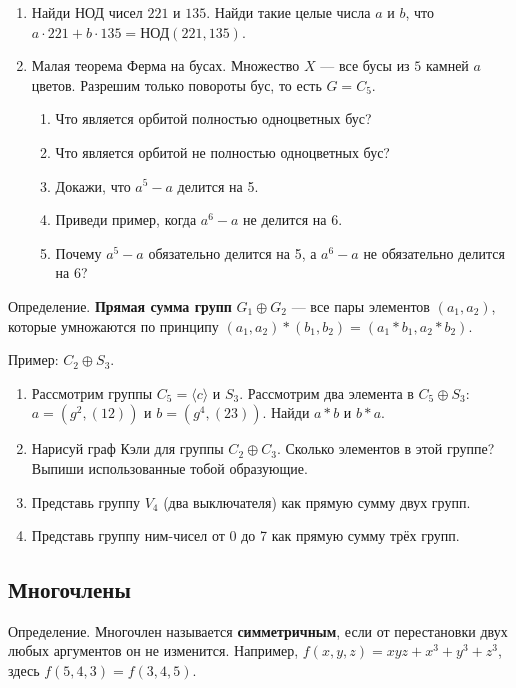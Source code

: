 \documentclass[12pt]{article} %
\begin{document}
\begin{enumerate}
\item Найди НОД чисел $221$ и $135$. Найди такие целые числа $a$ и $b$, что $a\cdot 221 + b\cdot 135 = \text{НОД}(221, 135)$.

\item Малая теорема Ферма на бусах. Множество $X$ — все бусы из $5$ камней $a$ цветов. Разрешим только повороты бус, то есть $G = C_5$.
\begin{enumerate}
\item Что является орбитой полностью одноцветных бус?
\item Что является орбитой не полностью одноцветных бус?
\item Докажи, что $a^5 - a$ делится на 5.
\item Приведи пример, когда $a^6 - a$ не делится на 6.
\item Почему $a^5 - a$ обязательно делится на 5, а $a^6 - a$ не обязательно делится на 6?
\end{enumerate}

\end{enumerate}


\newpage
Определение. \textbf{Прямая сумма групп} $G_1 \oplus G_2$ — все пары элементов $(a_1, a_2)$, которые умножаются по принципу $(a_1, a_2) * (b_1, b_2) = (a_1 * b_1, a_2 * b_2)$.

Пример: $C_2 \oplus S_3$.

\begin{enumerate}[resume]
\item Рассмотрим группы $C_5 = \langle c \rangle$ и $S_3$. Рассмотрим два элемента в $C_5 \oplus S_3$: $a = (g^2, (12))$ и $b = (g^4, (23))$. Найди $a*b$ и $b*a$.
\item Нарисуй граф Кэли для группы $C_2 \oplus C_3$. Сколько элементов в этой группе? Выпиши использованные тобой образующие.
\item Представь группу $V_4$ (два выключателя) как прямую сумму двух групп.
\item Представь группу ним-чисел от 0 до 7 как прямую сумму трёх групп.
\end{enumerate}



\subsection{Многочлены}

Определение. Многочлен называется \textbf{симметричным}, если от перестановки двух любых аргументов он не изменится. Например, $f(x,y,z)=xyz+x^3+y^3+z^3$, здесь $f(5,4,3)=f(3,4,5)$.
\end{document}
